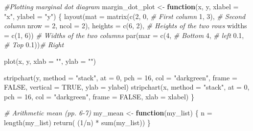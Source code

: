 \documentclass[
]{article}
\newenvironment{Shaded}{\begin{snugshade}}{\end{snugshade}}
\newcommand{\AttributeTok}[1]{\textcolor[rgb]{0.77,0.63,0.00}{#1}}
\newcommand{\CommentTok}[1]{\textcolor[rgb]{0.56,0.35,0.01}{\textit{#1}}}
\newcommand{\ConstantTok}[1]{\textcolor[rgb]{0.00,0.00,0.00}{#1}}
\newcommand{\ControlFlowTok}[1]{\textcolor[rgb]{0.13,0.29,0.53}{\textbf{#1}}}
\newcommand{\DecValTok}[1]{\textcolor[rgb]{0.00,0.00,0.81}{#1}}
\newcommand{\FloatTok}[1]{\textcolor[rgb]{0.00,0.00,0.81}{#1}}
\newcommand{\FunctionTok}[1]{\textcolor[rgb]{0.00,0.00,0.00}{#1}}
\newcommand{\NormalTok}[1]{#1}
\newcommand{\OtherTok}[1]{\textcolor[rgb]{0.56,0.35,0.01}{#1}}
\newcommand{\SpecialCharTok}[1]{\textcolor[rgb]{0.00,0.00,0.00}{#1}}
\newcommand{\StringTok}[1]{\textcolor[rgb]{0.31,0.60,0.02}{#1}}
\begin{document}
\begin{Shaded}
\begin{Highlighting}[]
\CommentTok{\#Plotting marginal dot diagram}
\NormalTok{margin\_dot\_plot }\OtherTok{\textless{}{-}} \ControlFlowTok{function}\NormalTok{(x, y, }\AttributeTok{xlabel =} \StringTok{"x"}\NormalTok{, }\AttributeTok{ylabel =} \StringTok{"y"}\NormalTok{) \{}
\FunctionTok{layout}\NormalTok{(}\AttributeTok{mat =} \FunctionTok{matrix}\NormalTok{(}\FunctionTok{c}\NormalTok{(}\DecValTok{2}\NormalTok{, }\DecValTok{0}\NormalTok{, }\CommentTok{\# First column}
                      \DecValTok{1}\NormalTok{, }\DecValTok{3}\NormalTok{), }\CommentTok{\# Second column }
                        \AttributeTok{nrow =} \DecValTok{2}\NormalTok{, }
                        \AttributeTok{ncol =} \DecValTok{2}\NormalTok{),}
       \AttributeTok{heights =} \FunctionTok{c}\NormalTok{(}\DecValTok{6}\NormalTok{, }\DecValTok{2}\NormalTok{),    }\CommentTok{\# Heights of the two rows}
       \AttributeTok{widths =} \FunctionTok{c}\NormalTok{(}\DecValTok{1}\NormalTok{, }\DecValTok{6}\NormalTok{))     }\CommentTok{\# Widths of the two columns}
\FunctionTok{par}\NormalTok{(}\AttributeTok{mar =} \FunctionTok{c}\NormalTok{(}\DecValTok{4}\NormalTok{, }\CommentTok{\# Bottom}
            \DecValTok{4}\NormalTok{, }\CommentTok{\# left}
            \FloatTok{0.1}\NormalTok{, }\CommentTok{\# Top}
            \FloatTok{0.1}\NormalTok{))}\CommentTok{\# Right}

\FunctionTok{plot}\NormalTok{(x, y, }\AttributeTok{xlab =} \StringTok{""}\NormalTok{, }\AttributeTok{ylab =} \StringTok{""}\NormalTok{)}

\FunctionTok{stripchart}\NormalTok{(y, }\AttributeTok{method =} \StringTok{"stack"}\NormalTok{, }\AttributeTok{at =} \DecValTok{0}\NormalTok{,}
           \AttributeTok{pch =} \DecValTok{16}\NormalTok{, }\AttributeTok{col =} \StringTok{"darkgreen"}\NormalTok{, }\AttributeTok{frame =} \ConstantTok{FALSE}\NormalTok{, }\AttributeTok{vertical =} \ConstantTok{TRUE}\NormalTok{, }\AttributeTok{ylab =}\NormalTok{ ylabel)}
\FunctionTok{stripchart}\NormalTok{(x, }\AttributeTok{method =} \StringTok{"stack"}\NormalTok{, }\AttributeTok{at =} \DecValTok{0}\NormalTok{,}
           \AttributeTok{pch =} \DecValTok{16}\NormalTok{, }\AttributeTok{col =} \StringTok{"darkgreen"}\NormalTok{, }\AttributeTok{frame =} \ConstantTok{FALSE}\NormalTok{, }\AttributeTok{xlab =}\NormalTok{ xlabel)}
\NormalTok{\}}


\CommentTok{\# Arithmetic mean (pp. 6{-}7)}
\NormalTok{my\_mean }\OtherTok{\textless{}{-}} \ControlFlowTok{function}\NormalTok{(my\_list) \{}
\NormalTok{  n }\OtherTok{=} \FunctionTok{length}\NormalTok{(my\_list)}
  \FunctionTok{return}\NormalTok{( (}\DecValTok{1}\SpecialCharTok{/}\NormalTok{n) }\SpecialCharTok{*} \FunctionTok{sum}\NormalTok{(my\_list))}
\NormalTok{\}}



\end{Highlighting}
\end{Shaded}
\end{document}
